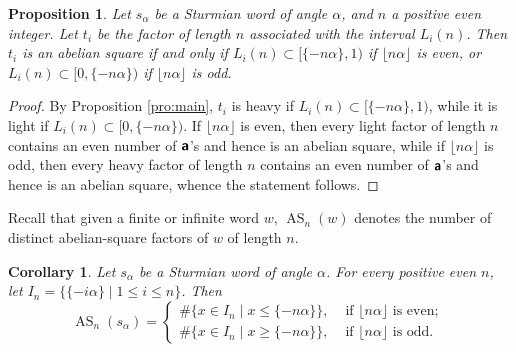 \documentclass[11pt,reqno]{amsart}
\numberwithin{equation}{section}
\theoremstyle{plain}
\newtheorem{corollary}[theorem]{Corollary}
\newtheorem{proposition}[theorem]{Proposition}
\theoremstyle{definition}
\theoremstyle{remark}
\DeclareMathOperator{\AS}{AS}
\newcommand{\ass}[2]{\AS_{#2}(#1)}
\def\cd3#1{\textbf{\textsf{#1}}}
\def\sa#1{\cd3{#1}}
\begin{document}
\begin{proposition}\label{prop:hl}
Let $s_{\alpha}$ be a Sturmian word of angle $\alpha$, and $n$ a positive even integer.
Let $t_{i}$ be the factor of length $n$ associated with the interval $L_{i}(n)$. Then $t_{i}$ is
an abelian square if and only if $L_{i}(n)\subset [\{-n\alpha\},1)$ if $\lfloor n \alpha \rfloor$ is even, or $L_{i}(n)\subset [0,\{-n\alpha\})$ if $\lfloor n \alpha \rfloor$ is odd.
\end{proposition}

\begin{proof}
By Proposition \ref{pro:main}, $t_i$ is heavy if $L_{i}(n)\subset [\{-n\alpha\},1)$, while it is light if $L_{i}(n)\subset [0,\{-n\alpha\})$. If $\lfloor n \alpha \rfloor$ is even, then every light factor of length $n$ contains an even number of $\sa{a}$'s and hence is an abelian square, while if $\lfloor n \alpha \rfloor$ is odd, then every heavy factor of length $n$ contains an even number of $\sa{a}$'s and hence is an abelian square, whence the statement follows.
\end{proof}

Recall that given a finite or infinite word $w$,  $\ass{w} {n}$ denotes the number of distinct abelian-square factors of $w$ of length $n$. 

\begin{corollary}\label{cor:formula}
 Let $s_{\alpha}$ be a Sturmian word of angle $\alpha$.
For every positive even $n$, let $I_{n}=\{\{-i \alpha\}\mid 1\le i \le n\}$. Then
\[
\ass{s_{\alpha}} {n} =
\begin{cases}
 \# \{x\in I_{n} \mid x \leq \{-n \alpha\}\}, & \text{ if $\lfloor n \alpha \rfloor$ is even; }\\
 \# \{x\in I_{n} \mid x \geq \{-n \alpha\}\}, & \text{ if $\lfloor n \alpha \rfloor$ is odd. }
\end{cases}
\]
\end{corollary}
\end{document}
